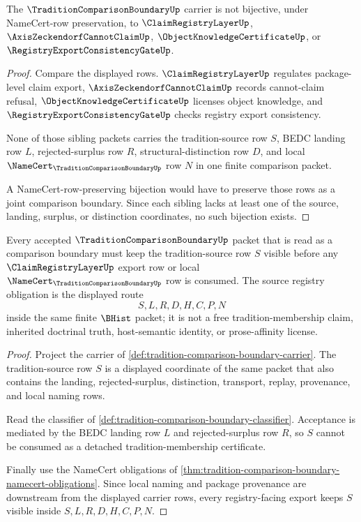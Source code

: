 \begin{theorem}
\label{thm:tradition-comparison-boundary-sibling-independence}
The $\TraditionComparisonBoundaryUp$ carrier is not bijective, under NameCert-row preservation, to $\ClaimRegistryLayerUp$, $\AxisZeckendorfCannotClaimUp$, $\ObjectKnowledgeCertificateUp$, or $\RegistryExportConsistencyGateUp$.
\end{theorem}
\begin{proof}
Compare the displayed rows. $\ClaimRegistryLayerUp$ regulates package-level claim export, $\AxisZeckendorfCannotClaimUp$ records cannot-claim refusal, $\ObjectKnowledgeCertificateUp$ licenses object knowledge, and $\RegistryExportConsistencyGateUp$ checks registry export consistency.

None of those sibling packets carries the tradition-source row $S$, BEDC landing row $L$, rejected-surplus row $R$, structural-distinction row $D$, and local $\NameCert_{\TraditionComparisonBoundaryUp}$ row $N$ in one finite comparison packet.

A NameCert-row-preserving bijection would have to preserve those rows as a joint comparison boundary. Since each sibling lacks at least one of the source, landing, surplus, or distinction coordinates, no such bijection exists.
\end{proof}

\begin{theorem}
\label{thm:tradition-comparison-boundary-source-registry-obligation}
Every accepted $\TraditionComparisonBoundaryUp$ packet that is read as a comparison boundary must keep the tradition-source row $S$ visible before any $\ClaimRegistryLayerUp$ export row or local $\NameCert_{\TraditionComparisonBoundaryUp}$ row is consumed. The source registry obligation is the displayed route
$$
S,L,R,D,H,C,P,N
$$
inside the same finite $\BHist$ packet; it is not a free tradition-membership claim, inherited doctrinal truth, host-semantic identity, or prose-affinity license.
\end{theorem}
\begin{proof}
Project the carrier of \autoref{def:tradition-comparison-boundary-carrier}. The tradition-source row $S$ is a displayed coordinate of the same packet that also contains the landing, rejected-surplus, distinction, transport, replay, provenance, and local naming rows.

Read the classifier of \autoref{def:tradition-comparison-boundary-classifier}. Acceptance is mediated by the BEDC landing row $L$ and rejected-surplus row $R$, so $S$ cannot be consumed as a detached tradition-membership certificate.

Finally use the NameCert obligations of \autoref{thm:tradition-comparison-boundary-namecert-obligations}. Since local naming and package provenance are downstream from the displayed carrier rows, every registry-facing export keeps $S$ visible inside $S,L,R,D,H,C,P,N$.
\end{proof}

